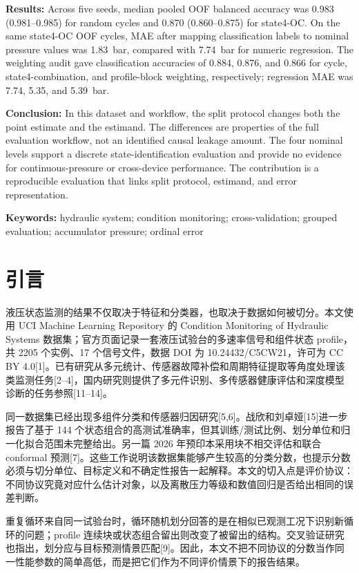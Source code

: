 \documentclass[UTF8,12pt,a4paper]{ctexart}
\begin{document}
\textbf{Results:} Across five seeds, median pooled OOF balanced accuracy was 0.983 (0.981--0.985) for random cycles and 0.870 (0.860--0.875) for state4-OC. On the same state4-OC OOF cycles, MAE after mapping classification labels to nominal pressure values was 1.83~bar, compared with 7.74~bar for numeric regression. The weighting audit gave classification accuracies of 0.884, 0.876, and 0.866 for cycle, state4-combination, and profile-block weighting, respectively; regression MAE was 7.74, 5.35, and 5.39~bar.

\textbf{Conclusion:} In this dataset and workflow, the split protocol changes both the point estimate and the estimand. The differences are properties of the full evaluation workflow, not an identified causal leakage amount. The four nominal levels support a discrete state-identification evaluation and provide no evidence for continuous-pressure or cross-device performance. The contribution is a reproducible evaluation that links split protocol, estimand, and error representation.

\textbf{Keywords:} hydraulic system; condition monitoring; cross-validation; grouped evaluation; accumulator pressure; ordinal error

\section{引言}
液压状态监测的结果不仅取决于特征和分类器，也取决于数据如何被切分。本文使用 UCI Machine Learning Repository 的 Condition Monitoring of Hydraulic Systems 数据集；官方页面记录一套液压试验台的多速率信号和组件状态 profile，共 2205 个实例、17 个信号文件，数据 DOI 为 10.24432/C5CW21，许可为 CC BY 4.0[1]。已有研究从多元统计、传感器故障补偿和周期特征提取等角度处理该类监测任务[2–4]，国内研究则提供了多元件识别、多传感器健康评估和深度模型诊断的任务参照[11–14]。

同一数据集已经出现多组件分类和传感器归因研究[5,6]。战欣和刘卓娅[15]进一步报告了基于 144 个状态组合的高测试准确率，但其训练/测试比例、划分单位和归一化拟合范围未完整给出。另一篇 2026 年预印本采用块不相交评估和联合 conformal 预测[7]。这些工作说明该数据集能够产生较高的分类分数，也提示分数必须与切分单位、目标定义和不确定性报告一起解释。本文的切入点是评价协议：不同协议究竟对应什么估计对象，以及离散压力等级和数值回归是否给出相同的误差判断。

重复循环来自同一试验台时，循环随机划分回答的是在相似已观测工况下识别新循环的问题；profile 连续块或状态组合留出则改变了被留出的结构。交叉验证研究也指出，划分应与目标预测情景匹配[9]。因此，本文不把不同协议的分数当作同一性能参数的简单高低，而是把它们作为不同评价情景下的报告结果。
\end{document}
